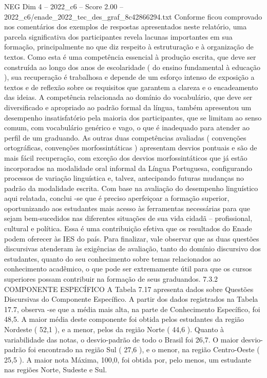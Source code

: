 \begin{textsample}{NEG Dim 4 – 2022\_c6 – Score 2.00 – 2022\_c6/enade\_2022\_tec\_des\_graf\_8c42866294.txt}
Conforme ficou comprovado nos comentários dos exemplos de respostas apresentados neste relatório, uma parcela significativa dos participantes revela lacunas importantes em sua formação, principalmente no que diz respeito à estruturação e à organização de textos.
Como esta é uma competência essencial à produção escrita, que deve ser construída ao longo dos anos de escolaridade ( do ensino fundamental à educação ), sua recuperação é trabalhosa e depende de um esforço intenso de exposição a textos e de reflexão sobre os requisitos que garantem a clareza e o encadeamento das ideias.
A competência relacionada ao domínio do vocabulário, que deve ser diversificado e apropriado ao padrão formal da língua, também apresentou um desempenho insatisfatório pela maioria dos participantes, que se limitam ao senso comum, com vocabulário genérico e vago, o que é inadequado para atender ao perfil de um graduando.
As outras duas competências avaliadas ( convenções ortográficas, convenções morfossintáticas ) apresentam desvios pontuais e são de mais fácil recuperação, com exceção dos desvios morfossintáticos que já estão incorporados na modalidade oral informal da Língua Portuguesa, configurando processos de variação linguística e, talvez, antecipando futuras mudanças no padrão da modalidade escrita.
Com base na avaliação do desempenho linguístico aqui relatada, conclui -se que é preciso aperfeiçoar a formação superior, oportunizando aos estudantes mais acesso às ferramentas necessárias para que sejam bem-sucedidos nas diferentes situações de sua vida cidadã – profissional, cultural e política.
Essa é uma contribuição efetiva que os resultados do Enade podem oferecer às IES do país.
Para finalizar, vale observar que as duas questões discursivas atenderam às exigências de avaliação, tanto do domínio discursivo dos estudantes, quanto do seu conhecimento sobre temas relacionados ao conhecimento acadêmico, o que pode ser extremamente útil para que os cursos superiores possam contribuir na formação de seus graduandos. 7.3.2 COMPONENTE ESPECÍFICO A Tabela 7.17 apresenta dados sobre Questões Discursivas do Componente Específico.
A partir dos dados registrados na Tabela 17.7, observa -se que a média mais alta, na parte de Conhecimento Específico, foi 48,5.
A maior média deste componente foi obtida pelos estudantes da região Nordeste ( 52,1 ), e a menor, pelos da região Norte ( 44,6 ).
Quanto à variabilidade das notas, o desvio-padrão de todo o Brasil foi 26,7.
O maior desvio-padrão foi encontrado na região Sul ( 27,6 ), e o menor, na região Centro-Oeste ( 25,5 ).
A maior nota Máxima, 100,0, foi obtida por, pelo menos, um estudante nas regiões Norte, Sudeste e Sul.

\end{textsample}
